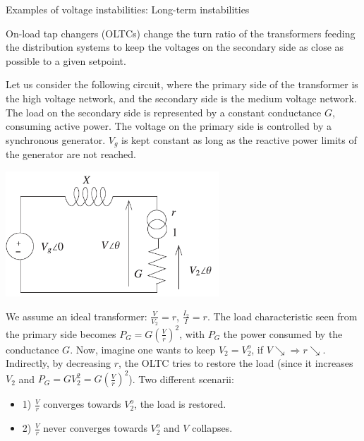 \begin{frame}[allowframebreaks]{Examples of voltage instabilities: Long-term instabilities}

On-load tap changers (OLTCs) change the turn ratio of the transformers feeding the distribution systems to keep the voltages on the secondary side as close as possible to a given setpoint.

Let us consider the following circuit, where the primary side of the transformer is the high voltage network, and the secondary side is the medium voltage network.
The load on the secondary side is represented by a constant conductance $G$, consuming active power.
The voltage on the primary side is controlled by a synchronous generator. $V_g$ is kept constant as long as the reactive power limits of the generator are not reached.
\begin{center}
\includegraphics[width=0.6\textwidth]{images/OLTC.png}
\end{center}

We assume an ideal transformer: $\frac{V}{V_2} = r$, $\frac{I_2}{I} = r$.
The load characteristic seen from the primary side becomes $P_G = G\left(\frac{V}{r}\right)^2$, with $P_G$ the power consumed by the conductance $G$.
Now, imagine one wants to keep $V_2 = V_2^o$, if $V \searrow \Rightarrow r \searrow$. Indirectly, by decreasing $r$, the OLTC tries to restore the load (since it increases $V_2$ and $P_G = G V_2^2 = G\left(\frac{V}{r}\right)^2$).
Two different scenarii:
\begin{itemize}
    \item 1) $\frac{V}{r}$ converges towards $V_2^o$, the load is restored.
    \item 2) $\frac{V}{r}$ never converges towards $V_2^o$ and $V$ collapses.
\end{itemize}



\end{frame}
